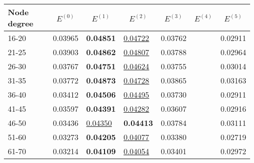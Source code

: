 \begin{table*}[]
    \centering
    \begin{tabular}{|l|l|l|l|l|l|l|}
        \hline
        Node degree & \multicolumn{1}{c|}{$E^{(0)}$} & \multicolumn{1}{c|}{$E^{(1)}$} & \multicolumn{1}{c|}{$E^{(2)}$} & \multicolumn{1}{c|}{$E^{(3)}$} & \multicolumn{1}{c|}{$E^{(4)}$} & \multicolumn{1}{c|}{$E^{(5)}$} \\ \hline
        16-20       & 0.03965                        & \textbf{0.04851}               & \underline{0.04722}            & 0.03762                        &                                & 0.02911                        \\ \hline
        21-25       & 0.03903                        & \textbf{0.04862}               & \underline{0.04807}            & 0.03788                        &                                & 0.02964                        \\ \hline
        26-30       & 0.03767                        & \textbf{0.04751}               & \underline{0.04624}            & 0.03755                        &                                & 0.03014                        \\ \hline
        31-35       & 0.03772                        & \textbf{0.04873}               & \underline{0.04728}            & 0.03865                        &                                & 0.03163                        \\ \hline
        36-40       & 0.03412                        & \textbf{0.04506}               & \underline{0.04495}            & 0.03730                        &                                & 0.02911                        \\ \hline
        41-45       & 0.03597                        & \textbf{0.04391}               & \underline{0.04282}            & 0.03607                        &                                & 0.02916                        \\ \hline
        46-50       & 0.03436                        & \underline{0.04350}            & \textbf{0.04413}               & 0.03784                        &                                & 0.03111                        \\ \hline
        51-60       & 0.03273                        & \textbf{0.04205}               & \underline{0.04077}            & 0.03380                        &                                & 0.02719                        \\ \hline
        61-70       & 0.03214                        & \textbf{0.04109}               & \underline{0.04054}            & 0.03401                        &                                & 0.02972                        \\ \hline

\end{tabular}
\end{table*}
